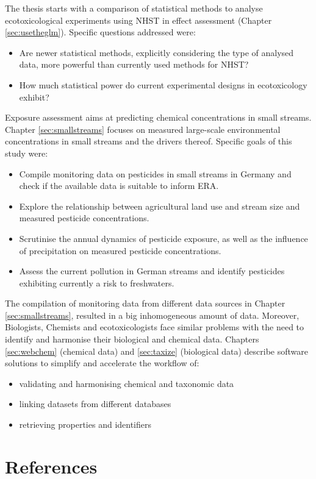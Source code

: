 \noindent The thesis starts with a comparison of statistical methods to analyse ecotoxicological experiments using NHST in effect assessment (Chapter \ref{sec:usetheglm}). 
Specific questions addressed were:

\begin{itemize}
	\item Are newer statistical methods, explicitly considering the type of analysed data, more powerful than currently used methods for NHST?
	\item How much statistical power do current experimental designs in ecotoxicology exhibit?
\end{itemize}


\noindent Exposure assessment aims at predicting chemical concentrations in small streams. 
Chapter \ref{sec:smallstreams} focuses on measured large-scale environmental concentrations in small streams and the drivers thereof. 
Specific goals of this study were:
\begin{itemize}
	\item Compile monitoring data on pesticides in small streams in Germany and check if the available data is suitable to inform ERA.
	\item Explore the relationship between agricultural land use and stream size and measured pesticide concentrations.
	\item Scrutinise the annual dynamics of pesticide exposure, as well as the influence of precipitation on measured pesticide concentrations.
	\item Assess the current pollution in German streams and identify pesticides exhibiting currently a risk to freshwaters.
\end{itemize}

\noindent
The compilation of monitoring data from different data sources in Chapter \ref{sec:smallstreams}, resulted in a big inhomogeneous amount of data.
Moreover, Biologists, Chemists and ecotoxicologists face similar problems with the need to identify and harmonise their biological and chemical data.
Chapters \ref{sec:webchem} (chemical data) and \ref{sec:taxize} (biological data) describe software solutions to simplify and accelerate the workflow of:

\begin{itemize}
	\item validating and harmonising chemical and taxonomic data
	\item linking datasets from different databases
	\item retrieving properties and identifiers
\end{itemize}






\newpage
\section{References}
\printbibliography[heading=none]

